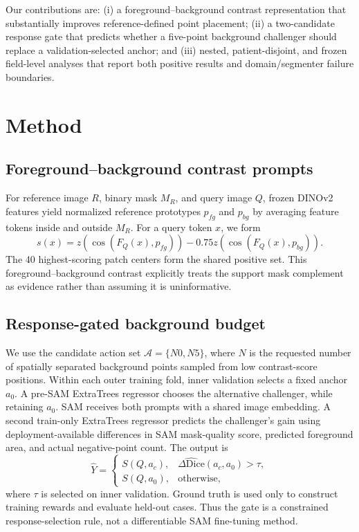 \documentclass[10pt,twocolumn]{article}
\newcommand{\dice}{\mathrm{Dice}}
\begin{document}
Our contributions are: (i) a foreground--background contrast representation that substantially improves reference-defined point placement; (ii) a two-candidate response gate that predicts whether a five-point background challenger should replace a validation-selected anchor; and (iii) nested, patient-disjoint, and frozen field-level analyses that report both positive results and domain/segmenter failure boundaries.

\section{Method}
\subsection{Foreground--background contrast prompts}
For reference image $R$, binary mask $M_R$, and query image $Q$, frozen DINOv2 features yield normalized reference prototypes $p_{fg}$ and $p_{bg}$ by averaging feature tokens inside and outside $M_R$. For a query token $x$, we form
\begin{equation}
s(x)=z(\cos(F_Q(x),p_{fg}))-0.75z(\cos(F_Q(x),p_{bg})).
\end{equation}
The 40 highest-scoring patch centers form the shared positive set. This foreground--background contrast explicitly treats the support mask complement as evidence rather than assuming it is uninformative.

\subsection{Response-gated background budget}
We use the candidate action set $\mathcal{A}=\{N0,N5\}$, where $N$ is the requested number of spatially separated background points sampled from low contrast-score positions. Within each outer training fold, inner validation selects a fixed anchor $a_0$. A pre-SAM ExtraTrees regressor chooses the alternative challenger, while retaining $a_0$. SAM receives both prompts with a shared image embedding. A second train-only ExtraTrees regressor predicts the challenger's gain using deployment-available differences in SAM mask-quality score, predicted foreground area, and actual negative-point count. The output is
\begin{equation}
\hat{Y}=\begin{cases}S(Q,a_c),&\widehat{\Delta\dice}(a_c,a_0)>\tau,\\S(Q,a_0),&\text{otherwise},\end{cases}
\end{equation}
where $\tau$ is selected on inner validation. Ground truth is used only to construct training rewards and evaluate held-out cases. Thus the gate is a constrained response-selection rule, not a differentiable SAM fine-tuning method.
\end{document}
